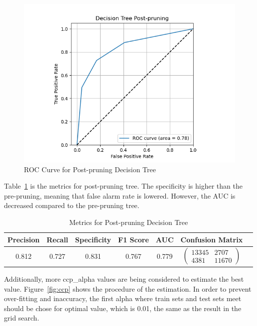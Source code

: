 \begin{figure}
    \centering
    \includegraphics[width=1\linewidth]{docs//assets/individual_roc_curve_Decision Tree Post-pruning.png}
    \caption{ROC Curve for Post-pruning Decision Tree}
    \label{fig:roc-dt-post}
\end{figure}

Table~\ref{tab:post-dt} is the metrics for post-pruning tree. The specificity is higher than the pre-pruning, meaning that false alarm rate is lowered. However, the AUC is decreased compared to the pre-pruning tree.

\begin{table}
\centering
\begin{tabular}{|c|c|c|c|c|c|c}
\hline
\textbf{Precision} & \textbf{Recall} & \textbf{Specificity} & \textbf{F1 Score} & \textbf{AUC} & \textbf{Confusion Matrix} \\
\hline
0.812 & 0.727 & 0.831 & 0.767 & 0.779 & $\left(\begin{array}{cc} 13345 & 2707 \\ 4381 & 11670 \end{array}\right)$ \\ 
\hline
\end{tabular}
\caption{Metrics for Post-pruning Decision Tree}
\label{tab:post-dt}
\end{table}

Additionally, more ccp\_alpha values are being considered to estimate the best value. Figure~\ref{fig:ccp} shows the procedure of the estimation. In order to prevent over-fitting and inaccuracy, the first alpha where train sets and test sets meet should be chose for optimal value, which is 0.01, the same as the result in the grid search.

